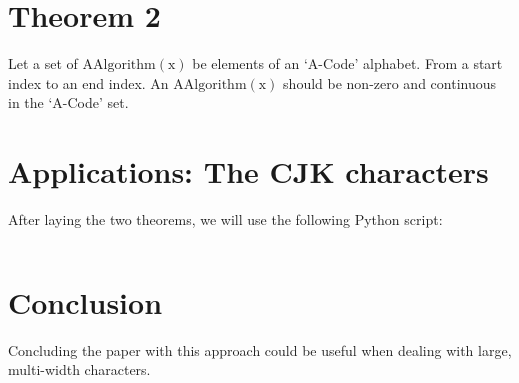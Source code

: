 \documentclass[10pt, twocolumn]{article}
\theoremstyle{plain}
\theoremstyle{definition}
\theoremstyle{remark}
\begin{document}
\section{Theorem 2}
\label{sec:acode-theorem02}

Let a set of $\operatorname{AAlgorithm(x)}$ be elements of an `A-Code' alphabet. From a start index to an end index. An $\operatorname{AAlgorithm(x)}$ should be non-zero and continuous in the `A-Code' set. 

\section{Applications: The CJK characters}
\label{sec:acode-conclusion}

After laying the two theorems, we will use the following Python script:

\begin{lstlisting}

\end{lstlisting}

\section{Conclusion}
\label{sec:acode-conclusion}

Concluding the paper with this approach could be useful when dealing with large, multi-width characters.
\end{document}
